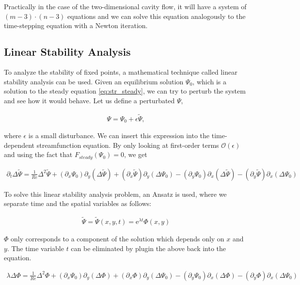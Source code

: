 Practically in the case of the two-dimensional cavity flow, it will have a
system of $(m-3) \cdot (n-3)$ equations and we can solve this equation
analogously to the time-stepping equation with a Newton iteration.

\subsection{Linear Stability Analysis}

To analyze the stability of fixed points, a mathematical technique called
linear stability analysis can be used. Given an equilibrium solution $\Psi_0$,
which is a solution to the steady equation \ref{eq:str_steady}, we can try to
perturb the system and see how it would behave. Let us define a perturbated
$\Psi$,

\begin{align}
\Psi = \Psi_0 + \epsilon \tilde{\Psi},
\end{align}

where $\epsilon$ is a small disturbance. We can insert this expression into the
time-dependent streamfunction equation. By only looking at first-order terms
$\mathcal{O}(\epsilon)$ and using the fact that $F_{steady}(\Psi_0) = 0$, we
get

\begin{align}
\partial_t \Delta \tilde{\Psi} = \frac{1}{Re} \Delta^2 \tilde{\Psi}
  + (\partial_x \Psi_0) \partial_y (\Delta \tilde{\Psi})
  + (\partial_x \tilde{\Psi}) \partial_y (\Delta \Psi_0)
  - (\partial_y \Psi_0) \partial_x (\Delta \tilde{\Psi})
  - (\partial_y \tilde{\Psi}) \partial_x (\Delta \Psi_0)
\label{eq:str_pert}
\end{align}

To solve this linear stability analysis problem, an Ansatz is used,
where we separate time and the spatial variables as follows: 

\begin{align}
  \tilde{\Psi} = \tilde{\Psi}(x,y,t) = \mathrm{e}^{\lambda t} \Phi(x,y)
\end{align}

$\Phi$ only corresponds to a component of the solution which depends only on
$x$ and $y$. The time variable $t$ can be eliminated by plugin the above back
into the equation.

\begin{align}
\lambda \Delta \Phi = \frac{1}{Re} \Delta^2 \Phi
  + (\partial_x \Psi_0) \partial_y (\Delta \Phi)
  + (\partial_x \Phi) \partial_y (\Delta \Psi_0)
  - (\partial_y \Psi_0) \partial_x (\Delta \Phi)
  - (\partial_y \Phi) \partial_x (\Delta \Psi_0)
\label{eq:str_phi}
\end{align}

